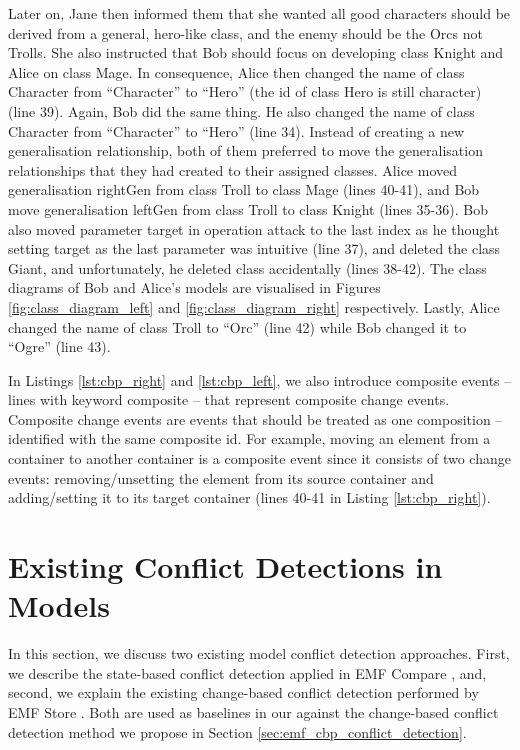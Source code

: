 Later on, Jane then informed them that she wanted all good characters should be derived from a general, hero-like class, and the enemy should be the Orcs not Trolls. She also instructed that Bob should focus on developing class \textsf{Knight} and Alice on class \textsf{Mage}. In consequence, Alice then changed the name of class \textsf{Character} from ``Character'' to ``Hero'' (the id of class \textsf{Hero} is still \textsf{character}) (line 39). Again, Bob did the same thing. He also changed the name of class \textsf{Character} from ``Character'' to ``Hero'' (line 34). Instead of creating a new generalisation relationship, both of them preferred to move the generalisation relationships that they had created to their assigned classes. Alice moved generalisation \textsf{rightGen} from class \textsf{Troll} to class \textsf{Mage} (lines 40-41), and Bob move generalisation \textsf{leftGen} from class \textsf{Troll} to class \textsf{Knight} (lines 35-36). Bob also moved parameter \textsf{target} in operation \textsf{attack} to the last index as he thought setting target as the last parameter was intuitive (line 37), and deleted the class {Giant}, and unfortunately, he deleted class  accidentally (lines 38-42). The class diagrams of Bob and Alice's models are visualised in Figures \ref{fig:class_diagram_left} and \ref{fig:class_diagram_right} respectively. Lastly, Alice changed the \textsf{name} of class \textsf{Troll} to ``Orc'' (line 42) while Bob changed it to ``Ogre'' (line 43).  

In Listings \ref{lst:cbp_right} and \ref{lst:cbp_left}, we also introduce composite events -- lines with keyword \textsf{composite} -- that represent composite change events. 
Composite change events are events that should be treated as one composition -- identified with the same composite id. 
For example, moving an element from a container to another container is a composite event since it consists of two change events: 
removing/unsetting the element from its source container and adding/setting it to its target container (lines 40-41 in Listing \ref{lst:cbp_right}).



\section{Existing Conflict Detections in Models}
\label{sec:existing_conflict_detections}

In this section, we discuss two existing model conflict detection approaches. First, we describe the state-based conflict detection applied in EMF Compare \cite{emfcompare2018developer}, and, second, we explain the existing change-based conflict detection performed by EMF Store \cite{emfstore2019what,koegel2010operation}. Both are used as baselines in our against the change-based conflict detection method we propose in Section \ref{sec:emf_cbp_conflict_detection}.

